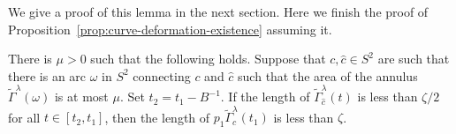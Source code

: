 We give a proof of this lemma in the next section. Here we finish
the proof of Proposition~\ref{prop:curve-deformation-existence} assuming it.

\begin{claim}
\label{claim:mu-net-length-comparison}
\label{mulength}
There is $\mu>0$ such that the following holds. Suppose that $c,\hat
c\in S^2$ are such that there is an arc $\omega$ in $S^2$ connecting
$c$ and $\hat c$ such that the area of the annulus
$\widetilde\Gamma^\lambda(\omega)$ is at most $\mu$.  Set
$t_2=t_1-B^{-1}$. If the length of $\widetilde\Gamma_{\hat
c}^\lambda(t)$ is less than $\zeta/2$ for all $t\in [t_2,t_1]$, then
the length of $p_1\widetilde\Gamma_c^\lambda(t_1)$ is less than
$\zeta$.
\end{claim}

